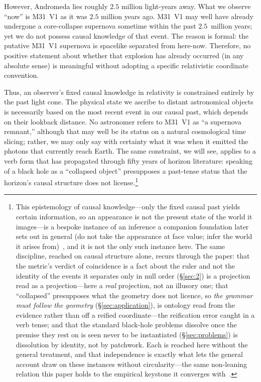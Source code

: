 \documentclass[11pt,a4paper]{article}
\theoremstyle{plain}
\theoremstyle{remark}
\begin{document}
However, Andromeda lies roughly $2.5$ million light-years away. What we observe ``now'' is M31~V1 as it was $2.5$ million years ago. M31~V1 may well have already undergone a core-collapse supernova sometime within the past $2.5$~million years; yet we do not possess causal knowledge of that event. The reason is formal: the putative M31~V1 supernova is spacelike separated from here-now. Therefore, no positive statement about whether that explosion has already occurred (in any absolute sense) is meaningful without adopting a specific relativistic coordinate convention.

Thus, an observer's fixed causal knowledge in relativity is constrained entirely by the past light cone. The physical state we ascribe to distant astronomical objects is necessarily based on the most recent event in our causal past, which depends on their lookback distance. No astronomer refers to M31~V1 as ``a supernova remnant,'' although that may well be its status on a natural cosmological time slicing; rather, we may only say with certainty what it was when it emitted the photons that currently reach Earth. The same constraint, we will see, applies to a verb form that has propagated through fifty years of horizon literature: speaking of a black hole as a ``collapsed object'' presupposes a past-tense status that the horizon's causal structure does not license.\footnote{This epistemology of causal knowledge---only the fixed causal past yields certain information, so an appearance is not the present state of the world it images---is a bespoke instance of an inference a companion foundation later sets out in general (do not take the appearance at face value; infer the world it arises from)~\cite{JanzenShadowExistence}, and it is not the only such instance here. The same discipline, reached on causal structure alone, recurs through the paper: that the metric's verdict of coincidence is a fact about the ruler and not the identity of the events it separates only in null order (\S\ref{sec:2}) is a projection read as a projection---here a \emph{real} projection, not an illusory one; that ``collapsed'' presupposes what the geometry does not licence, so \emph{the grammar must follow the geometry} (\S\ref{sec:application}), is ontology read from the evidence rather than off a reified coordinate---the reification error caught in a verb tense; and that the standard black-hole problems dissolve once the premise they rest on is seen never to be instantiated (\S\ref{sec:problems}) is dissolution by identity, not by patchwork. Each is reached here without the general treatment, and that independence is exactly what lets the general account draw on these instances without circularity---the same non-leaning relation this paper holds to the empirical keystone it converges with~\cite{JanzenModernParallax}.}
\end{document}
